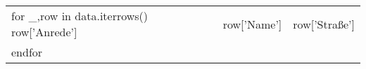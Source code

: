 \documentclass[12pt,ngerman]{scrartcl}
\newcommand{\VAR}[1]{#1}
\newcommand{\BLOCK}[1]{#1}
\begin{document}
\begin{tabular}{lll}
	\BLOCK{ for _,row in data.iterrows()}
    \VAR{row['Anrede'] } & \VAR{row['Name'] } &\VAR{row['Straße'] } \\
	\BLOCK{ endfor }
\end{tabular}
\end{document}
